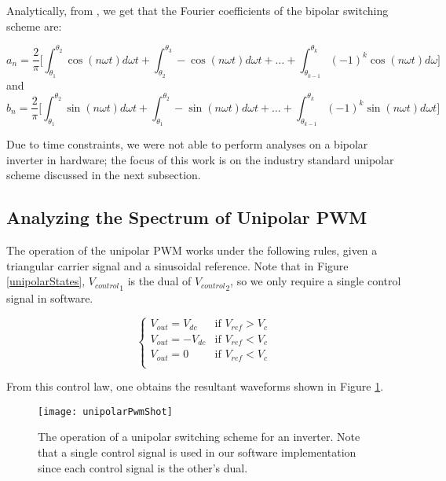 Analytically, from \cite{FourierAnlaysis}, we get that the Fourier coefficients of the bipolar switching scheme are:

\begin{equation}
a_n = \frac{2}{\pi} \Big[\int_{\theta_1}^{\theta_2} \cos(n\omega t) d\omega t + \int_{\theta_2}^{\theta_3} -\cos(n\omega t)d\omega t +\ldots +
\int_{\theta_{k-1}}^{\theta_{k}} (-1)^k \cos(n\omega t)d\omega \Big]
\end{equation} 
and 
\begin{equation}
b_n = \frac{2}{\pi} \Big[\int_{\theta_1}^{\theta_2} \sin(n\omega t) d\omega t + \int_{\theta_1}^{\theta_2} -\sin(n\omega t)d\omega t +\ldots +
\int_{\theta_{k-1}}^{\theta_{k}} (-1)^k \sin(n\omega t)d\omega t \Big]
\end{equation} 

Due to time constraints, we were not able to perform analyses on a bipolar inverter in hardware; the focus of this work is on the industry standard unipolar scheme discussed in the next subsection. 

\subsection{Analyzing the Spectrum of Unipolar PWM}
\label{uniSpectrum}
The operation of the unipolar PWM works under the following rules, given a triangular carrier signal and a sinusoidal reference. Note that in Figure \ref{unipolarStates}, ${V_{control}}_{1}$ is the dual of ${V_{control}}_{2}$, so we only require a single control signal in software.

\begin{equation}
\label{unipolarStates}
\begin{cases}
V_{out} = V_{dc} &\mbox{if $V_{ref} > V_{c}$}  \\
V_{out} = -V_{dc} &\mbox{if $V_{ref} < V_{c}$}  \\
V_{out} = 0 &\mbox{if $V_{ref} < V_{c}$}  \\
\end{cases}
\end{equation}

From this control law, one obtains the resultant waveforms shown in Figure \ref{unipolarPwmShot}.
\begin{figure}
\centering
\texttt{[image: unipolarPwmShot]}
\caption{The operation of a unipolar switching scheme for an inverter. Note that a single control signal is used in our software implementation since each control signal is the other's dual. \cite{FourierAnalysis}}
\label{unipolarPwmShot}
\end{figure}

